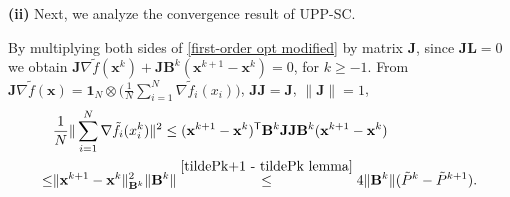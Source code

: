 \documentclass[10pt,a4paper]{amsart}
\begin{document}
\textbf{(ii)}
Next, we analyze the convergence result of UPP-SC. 

By multiplying both sides of \eqref{first-order opt modified} by matrix $\mathbf{J}$, since $\mathbf{J}\mathbf{L}=0$ we obtain $\mathbf{J}\nabla \tilde{f}(\mathbf{x}^{k}) + \mathbf{J}\mathbf{B}^k(\mathbf{x}^{k+1}-\mathbf{x}^{k})=0$, for $k \geq -1.$
From $\mathbf{J}\nabla \tilde{f}(\mathbf{x})=\mathbf{1}_N \otimes\big(\frac{1}{N} \sum_{i=1}^{N}\nabla\tilde{f}_i(x_i)\big)$, $\mathbf{J}\mathbf{J}=\mathbf{J}$, $\|\mathbf{J}\|=1$,
\begin{align}
	&\frac{1}{N}\|\sum_{i=1}^N \nabla \tilde{f}_i(x_i^k)\|^2 \leq (\mathbf{x}^{k+1}-\mathbf{x}^{k})^{\mathsf{T}}\mathbf{B}^k\mathbf{J}\mathbf{J}\mathbf{B}^k(\mathbf{x}^{k+1}-\mathbf{x}^{k}) \notag\\
	\leq & \|\mathbf{x}^{k+1}-\mathbf{x}^{k}\|^2_{\mathbf{B}^k}\|\mathbf{B}^k\| 
	\overset{\eqref{tildePk+1 - tildePk lemma}}{\leq} 4\|\mathbf{B}^k\|(\tilde{P}^k-\tilde{P}^{k+1}). \label{bounded gradient norm Bk}
\end{align}
\end{document}
